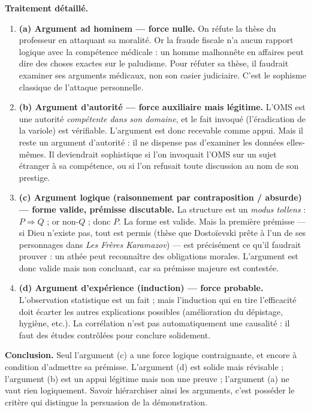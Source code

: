 \documentclass[11pt]{article}
\begin{document}
\begin{exoresolu}
\textbf{Traitement détaillé.}
\begin{enumerate}
\item \textbf{(a) Argument ad hominem — force nulle.} On réfute la thèse du professeur en attaquant sa moralité. Or la fraude fiscale n'a aucun rapport logique avec la compétence médicale : un homme malhonnête en affaires peut dire des choses exactes sur le paludisme. Pour réfuter sa thèse, il faudrait examiner ses arguments médicaux, non son casier judiciaire. C'est le sophisme classique de l'attaque personnelle.
\item \textbf{(b) Argument d'autorité — force auxiliaire mais légitime.} L'OMS est une autorité \emph{compétente dans son domaine}, et le fait invoqué (l'éradication de la variole) est vérifiable. L'argument est donc recevable comme appui. Mais il reste un argument d'autorité : il ne dispense pas d'examiner les données elles-mêmes. Il deviendrait sophistique si l'on invoquait l'OMS sur un sujet étranger à sa compétence, ou si l'on refusait toute discussion au nom de son prestige.
\item \textbf{(c) Argument logique (raisonnement par contraposition / absurde) — forme valide, prémisse discutable.} La structure est un \emph{modus tollens} : $P \Rightarrow Q$ ; or non-$Q$ ; donc $P$. La forme est valide. Mais la première prémisse — \guillemotleft si Dieu n'existe pas, tout est permis \guillemotright (thèse que Dostoïevski prête à l'un de ses personnages dans \emph{Les Frères Karamazov}) — est précisément ce qu'il faudrait prouver : un athée peut reconnaître des obligations morales. L'argument est donc valide mais non concluant, car sa prémisse majeure est contestée.
\item \textbf{(d) Argument d'expérience (induction) — force probable.} L'observation statistique est un fait ; mais l'induction qui en tire l'efficacité doit écarter les autres explications possibles (amélioration du dépistage, hygiène, etc.). La corrélation n'est pas automatiquement une causalité : il faut des études contrôlées pour conclure solidement.
\end{enumerate}

\textbf{Conclusion.} Seul l'argument (c) a une force logique contraignante, et encore à condition d'admettre sa prémisse. L'argument (d) est solide mais révisable ; l'argument (b) est un appui légitime mais non une preuve ; l'argument (a) ne vaut rien logiquement. Savoir hiérarchiser ainsi les arguments, c'est posséder le critère qui distingue la persuasion de la démonstration.
\end{exoresolu}
\end{document}

